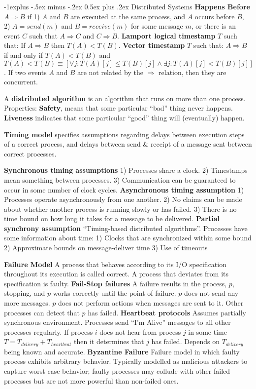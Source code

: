 \documentclass[6pt,landscape]{article}
\makeatletter
\renewcommand{\subsection}{\@startsection{subsection}{2}{0mm}%
                                {-1explus -.5ex minus -.2ex}%
                                {0.5ex plus .2ex}%
                                {\normalfont\normalsize\bfseries}}
\makeatother
\begin{document}
\begin{multicols}{3}
\subsection{Distributed Systems}
{\bf Happens Before} $A \Rightarrow B$ if 
1) $A$ and $B$ are executed at the same process, and $A$
occurs before $B$, 
2) $A = send(m)$ and $B = receive(m)$ for some message $m$, or there is an event $C$ such that $A \Rightarrow C$ and $C \Rightarrow B$. 
{\bf Lamport logical timestamp} $T$ such that: If $A \Rightarrow B$ then $T(A) < T(B)$.
{\bf Vector timestamp} $T$ such that: $A \Rightarrow B$ if and only if $T(A) < T(B)$ and $T(A) < T(B) \equiv [\forall j: T(A)[j] \le T(B)[j] \wedge \exists j: T(A)[j] < T(B)[j]]$.
If two events $A$ and $B$ are not related by the $\Rightarrow$ relation, then they are concurrent.

A {\bf distributed algorithm} is an algorithm that runs on more than one process. Properties: {\bf Safety}, means that some particular ``bad'' thing never happens. {\bf Liveness} indicates that some particular ``good'' thing will (eventually) happen.

{\bf Timing model} specifies assumptions regarding delays between execution steps of a correct process, and delays between send \& receipt of a message sent between correct processes.

{\bf Synchronous timing assumptions} 
1) Processes share a clock. 2) Timestamps mean something between processes. 3) Communication can be guaranteed to occur in some number of clock cycles.
{\bf Asynchronous timing assumption}
1) Processes operate asynchronously from one another.
2) No claims can be made about whether another process is running slowly or has failed.
3) There is no time bound on how long it takes for a message to be delivered.
{\bf Partial synchrony assumption} ``Timing-based distributed algorithms''. Processes have some information about time:
1) Clocks that are synchronized within some bound 
2) Approximate bounds on message-deliver time
3) Use of timeouts

{\bf Failure Model} A process that behaves according to its I/O specification throughout its execution is called correct. A process that deviates from its specification is faulty.
{\bf Fail-Stop failures} A failure results in the process, $p$, stopping, and $p$ works correctly until the point of failure. $p$ does not send any more messages. $p$ does not perform actions when messages are sent to it. Other processes can detect that $p$ has failed.
{\bf Heartbeat protocols} Assumes partially synchronous environment. Processes send “I’m Alive” messages to all other processes regularly. If process $i$ does not hear from process $j$ in some time $T = T_{delivery} + T_{heartbeat}$ then it determines that $j$ has failed. Depends on $T_{delivery}$ being known and accurate.
{\bf Byzantine Failure} Failure model in which faulty process exhibits arbitrary behavior. 
Typically modelled as malicious attackers to capture worst case behavior; 
faulty processes may collude with other failed processes but are not more 
powerful than non-failed ones.


\end{multicols}
\end{document}
